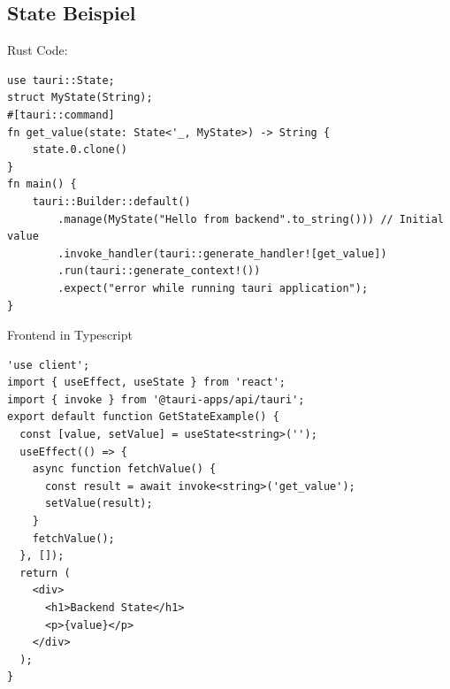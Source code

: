 \subsection{State Beispiel} 
\label{subsec:state-example}

Rust Code:

\begin{verbatim}
use tauri::State;
struct MyState(String);
#[tauri::command]
fn get_value(state: State<'_, MyState>) -> String {
    state.0.clone()
}
fn main() {
    tauri::Builder::default()
        .manage(MyState("Hello from backend".to_string())) // Initial value
        .invoke_handler(tauri::generate_handler![get_value])
        .run(tauri::generate_context!())
        .expect("error while running tauri application");
}
\end{verbatim}

Frontend in Typescript

\begin{verbatim}
'use client';
import { useEffect, useState } from 'react';
import { invoke } from '@tauri-apps/api/tauri';
export default function GetStateExample() {
  const [value, setValue] = useState<string>('');
  useEffect(() => {
    async function fetchValue() {
      const result = await invoke<string>('get_value');
      setValue(result);
    }
    fetchValue();
  }, []);
  return (
    <div>
      <h1>Backend State</h1>
      <p>{value}</p>
    </div>
  );
}
\end{verbatim}


